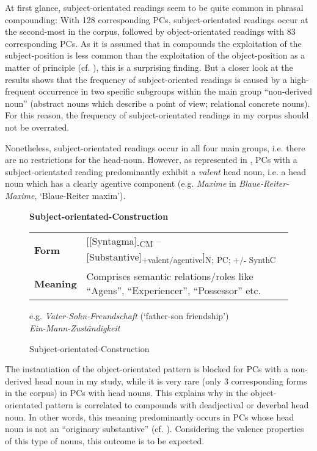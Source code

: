 \documentclass[output=paper]{LSP/langsci}
\begin{document}
At first glance, subject-orientated readings seem to be quite common in phrasal compounding: With 128 corresponding PCs, subject-orientated readings occur at the second-most in the corpus, followed by object-orientated readings with 83 corresponding PCs. As it is assumed that in  compounds the exploitation of the subject-position is less common than the exploitation of the object-position as a matter of principle (cf. \citealt[131]{Eichinger2000}), this is a surprising finding. But a closer look at the results shows that the frequency of subject-oriented readings is caused by a high-frequent occurrence in two specific subgroups within the main group ``non-derived noun'' (abstract nouns which describe a point of view; relational concrete nouns). For this reason, the frequency of subject-orientated readings in my corpus should not be overrated.



Nonetheless, subject-orientated readings occur in all four main groups, i.e. there are no restrictions for the head-noun. However, as represented in , PCs with a subject-orientated reading predominantly exhibit a \textit{valent} head noun, i.e. a head noun which has a clearly agentive component (e.g. \textit{Maxime} in \textit{Blaue-Reiter-Maxime}, ‘Blaue-Reiter maxim’). 

\begin{figure}[t]
\caption{Subject-orientated-Construction\label{fig:hein:1.7}}
\begin{framed}\raggedright
\textbf{Subject-orientated-Construction}\\[1.5\baselineskip]
\begin{tabularx}{\linewidth}{lX}
\textbf{Form} & [[Syntagma]\textsubscript{{}-CM} -- [Substantive]\textsubscript{+valent/agentive}]\textsubscript{N;} \textsubscript{PC; +/- SynthC} \\
\textbf{Meaning} & Comprises semantic relations/roles like ``Agens'', ``Experiencer'', ``Possessor'' etc.\\
\end{tabularx}
\vspace{\baselineskip}\par
  e.g. \textit{Vater-Sohn-Freundschaft} (‘father-son friendship')\textit{\\
 Ein-Mann-Zuständigkeit}
\end{framed}
\end{figure}


The instantiation of the object-orientated pattern is blocked for PCs with a non-derived head noun in my study, while it is very rare (only 3 corresponding forms in the corpus) in PCs with  head nouns. This explains why in  the object-orientated pattern is correlated to compounds with deadjectival or deverbal head noun. In other words, this meaning predominantly occurs in PCs whose head noun is not an ``originary substantive'' (cf. \citealt[235]{Hölzner2007}). Considering the valence properties of this type of nouns, this outcome is to be expected.  
\end{document}
